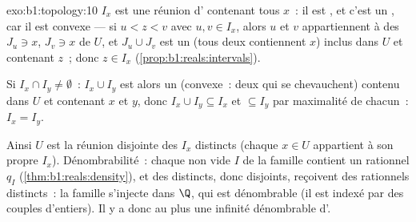 \begin{solution}{exo:b1:topology:10}
$I_x$ est une réunion d'  contenant tous $x$~: il
est , et c'est un , car il est convexe --- si
$u < z < v$ avec $u, v \in I_x$, alors $u$ et $v$ appartiennent à des
  $J_u \ni x$, $J_v \ni x$ de $U$, et
$J_u \cup J_v$ est un  (tous deux contiennent $x$) inclus
dans $U$ et contenant $z$~; donc $z \in I_x$
(\cref{prop:b1:reals:intervals}).

Si $I_x \cap I_y \neq \emptyset$~: $I_x \cup I_y$ est alors un
  (convexe~: deux  qui se chevauchent)
contenu dans $U$ et contenant $x$ et $y$, donc $I_x \cup I_y \subseteq
I_x$ et $\subseteq I_y$ par maximalité de chacun~: $I_x = I_y$.

Ainsi $U$ est la réunion disjointe des  $I_x$ distincts
(chaque $x \in U$ appartient à son propre $I_x$). Dénombrabilité~:
chaque   non vide $I$ de la famille contient un
rationnel $q_I$ (\cref{thm:b1:reals:density}), et des 
distincts, donc disjoints, reçoivent des rationnels distincts~: la
famille s'injecte dans $\Q$, qui est dénombrable (il est indexé par
des couples d'entiers). Il y a donc au plus une infinité dénombrable
d'.
\end{solution}

